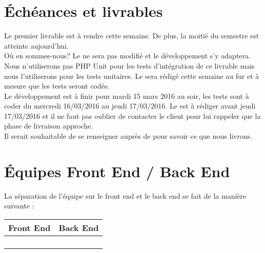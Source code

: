 \documentclass [a4paper] {article}
\begin{document}
\section{Échéances et livrables}
Le premier livrable est à rendre cette semaine. De plus, la moitié du semestre est atteinte aujourd'hui. \\
Où en sommes-nous? Le \PTI{} ne sera pas modifié et le développement s'y adaptera. Nous n'utiliserons pas PHP Unit pour les tests d'intégration de ce livrable mais nous l'utiliserons pour les tests unitaires. Le \PTU{} sera rédigé cette semaine au fur et à mesure que les tests seront codés. \\
Le développement est à finir pour mardi 15 mars 2016 au soir, les tests sont à coder du mercredi 16/03/2016 au jeudi 17/03/2016. Le \CDR{} est à rédiger avant jeudi 17/03/2016 et il ne faut pas oublier de contacter le client pour lui rappeler que la phase de livraison approche. \\
Il serait souhaitable de se renseigner auprès de \nomTuteurPedago{} pour savoir ce que nous livrons.

\section{Équipes Front End / Back End}
La séparation de l'équipe sur le front end et le back end se fait de la manière suivante : \\
	\begin{tabular}{| p{5cm} | p{5cm} |}
		\hline
		\rowcolor{Gray}
		Front End & Back End		 \\
		\hline
		\Matthieu & \Florian \\
		\Mathieu & \Kafui \\
		\Julie & \Michel \\
		 & \Melissa \\
		\hline
	\end{tabular}
\end{document}
